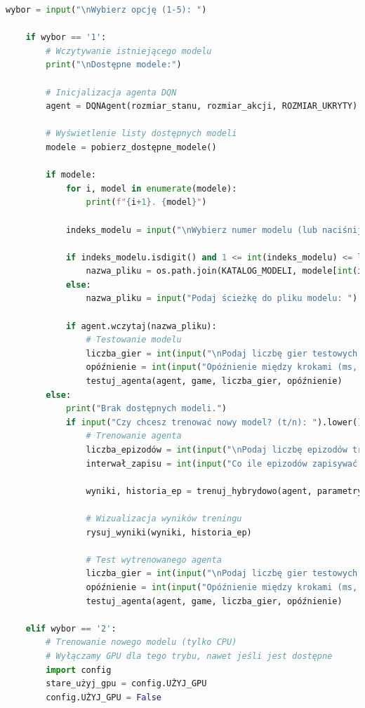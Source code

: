 \documentclass[a4paper,12pt]{article}
\begin{document}
\begin{lstlisting}[language=Python]
    wybor = input("\nWybierz opcję (1-5): ")
    
    if wybor == '1':
        # Wczytywanie istniejącego modelu
        print("\nDostępne modele:")
        
        # Inicjalizacja agenta DQN
        agent = DQNAgent(rozmiar_stanu, rozmiar_akcji, ROZMIAR_UKRYTY)
        
        # Wyświetlenie listy dostępnych modeli
        modele = pobierz_dostępne_modele()
        
        if modele:
            for i, model in enumerate(modele):
                print(f"{i+1}. {model}")
            
            indeks_modelu = input("\nWybierz numer modelu (lub naciśnij Enter, aby wpisać własną nazwę pliku): ")
            
            if indeks_modelu.isdigit() and 1 <= int(indeks_modelu) <= len(modele):
                nazwa_pliku = os.path.join(KATALOG_MODELI, modele[int(indeks_modelu)-1])
            else:
                nazwa_pliku = input("Podaj ścieżkę do pliku modelu: ")
            
            if agent.wczytaj(nazwa_pliku):
                # Testowanie modelu
                liczba_gier = int(input("\nPodaj liczbę gier testowych: ") or "5")
                opóźnienie = int(input("Opóźnienie między krokami (ms, 0-500): ") or "100")
                testuj_agenta(agent, game, liczba_gier, opóźnienie)
        else:
            print("Brak dostępnych modeli.")
            if input("Czy chcesz trenować nowy model? (t/n): ").lower() == 't':
                # Trenowanie agenta
                liczba_epizodów = int(input("\nPodaj liczbę epizodów treningu: ") or "1000")
                interwał_zapisu = int(input("Co ile epizodów zapisywać model: ") or "100")
                
                wyniki, historia_ep = trenuj_hybrydowo(agent, parametry_gry, liczba_epizodów, interwał_zapisu=interwał_zapisu)
                
                # Wizualizacja wyników treningu
                rysuj_wyniki(wyniki, historia_ep)
                
                # Test wytrenowanego agenta
                liczba_gier = int(input("\nPodaj liczbę gier testowych: ") or "5")
                opóźnienie = int(input("Opóźnienie między krokami (ms, 0-500): ") or "100")
                testuj_agenta(agent, game, liczba_gier, opóźnienie)
    
    elif wybor == '2':
        # Trenowanie nowego modelu (tylko CPU)
        # Wyłączamy GPU dla tego trybu, nawet jeśli jest dostępne
        import config
        stare_użyj_gpu = config.UŻYJ_GPU
        config.UŻYJ_GPU = False
        

\end{lstlisting}
\end{document}
